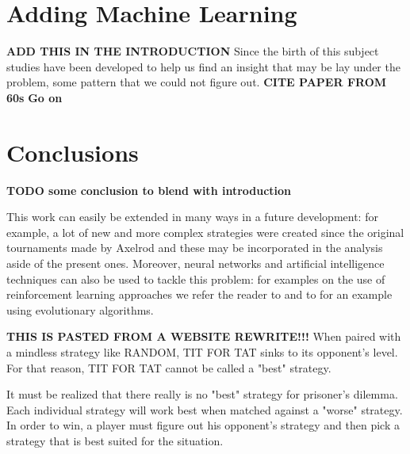 \documentclass[journal,a4paper,10pt,twoside]{IEEEtran} %
\begin{document}
\section{Adding Machine Learning}
\textbf{ADD THIS IN THE INTRODUCTION}
Since the birth of this subject studies have been developed to help us find an insight that may be lay under the problem, some pattern that we could not figure out. \textbf{CITE PAPER FROM 60s}
\textbf{Go on}


\section{Conclusions} \label{s:conc}
\textbf{TODO some conclusion to blend with introduction}

This work can easily be extended in many ways in a future development: for example, a lot of new and more complex strategies were created since the original tournaments made by Axelrod and these may be incorporated in the analysis aside of the present ones.
Moreover, neural networks and artificial intelligence techniques can also be used to tackle this problem: for examples on the use of reinforcement learning approaches we refer the reader to \cite{plosRLdominant,coopSeqRL,kedaoRL} and to \cite{shashiEvoAlg} for an example using evolutionary algorithms.

\textbf{THIS IS PASTED FROM A WEBSITE REWRITE!!!}
When paired with a mindless strategy like RANDOM, TIT FOR TAT sinks to its opponent's level. For that reason, TIT FOR TAT cannot be called a "best" strategy.

It must be realized that there really is no "best" strategy for prisoner's dilemma. Each individual strategy will work best when matched against a "worse" strategy. In order to win, a player must figure out his opponent's strategy and then pick a strategy that is best suited for the situation.
\balance


\end{document}
